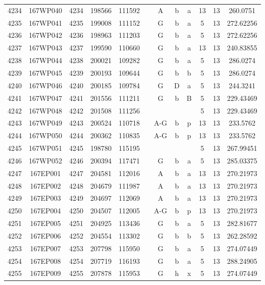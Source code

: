 \begin{tabular}{|*{12}{c|}}
4234 & 167WP040 & 4234 & 198566 & 111592 &  & A & b & a & 13 & 13 & 260.0751 \\ 
4235 & 167WP041 & 4235 & 199008 & 111152 &  & G & b & a & 5 & 13 & 272.62256 \\ 
4236 & 167WP042 & 4236 & 198963 & 111203 &  & G & b & a & 5 & 13 & 272.62256 \\ 
4237 & 167WP043 & 4237 & 199590 & 110660 &  & G & b & a & 13 & 13 & 240.83855 \\ 
4238 & 167WP044 & 4238 & 200021 & 109282 &  & G & b & a & 5 & 13 & 286.0274 \\ 
4239 & 167WP045 & 4239 & 200193 & 109644 &  & G & b & b & 5 & 13 & 286.0274 \\ 
4240 & 167WP046 & 4240 & 200185 & 109784 &  & G & D & a & 5 & 13 & 244.3241 \\ 
4241 & 167WP047 & 4241 & 201556 & 111211 &  & G & b & B & 5 & 13 & 229.43469 \\ 
4242 & 167WP048 & 4242 & 201508 & 111256 &  &  &  &  & 5 & 13 & 229.43469 \\ 
4243 & 167WP049 & 4243 & 200524 & 110718 &  & A-G & b & p & 13 & 13 & 233.5762 \\ 
4244 & 167WP050 & 4244 & 200362 & 110835 &  & A-G & b & p & 13 & 13 & 233.5762 \\ 
4245 & 167WP051 & 4245 & 198780 & 115195 &  &  &  &  & 5 & 13 & 267.99451 \\ 
4246 & 167WP052 & 4246 & 200394 & 117471 &  & G & b & a & 5 & 13 & 285.03375 \\ 
4247 & 167EP001 & 4247 & 204581 & 112016 &  & A & b & a & 13 & 13 & 270.21973 \\ 
4248 & 167EP002 & 4248 & 204679 & 111987 &  & A & b & a & 13 & 13 & 270.21973 \\ 
4249 & 167EP003 & 4249 & 204697 & 112069 &  & A & b & a & 13 & 13 & 270.21973 \\ 
4250 & 167EP004 & 4250 & 204507 & 112005 &  & A-G & b & p & 13 & 13 & 270.21973 \\ 
4251 & 167EP005 & 4251 & 204925 & 113436 &  & G & b & a & 5 & 13 & 282.81677 \\ 
4252 & 167EP006 & 4252 & 204554 & 113302 &  & G & b & b & 5 & 13 & 262.28592 \\ 
4253 & 167EP007 & 4253 & 207798 & 115950 &  & G & b & a & 5 & 13 & 274.07449 \\ 
4254 & 167EP008 & 4254 & 207719 & 116193 &  & G & b & a & 5 & 13 & 288.24905 \\ 
4255 & 167EP009 & 4255 & 207878 & 115953 &  & G & h & x & 5 & 13 & 274.07449 \\ 

\end{tabular}
